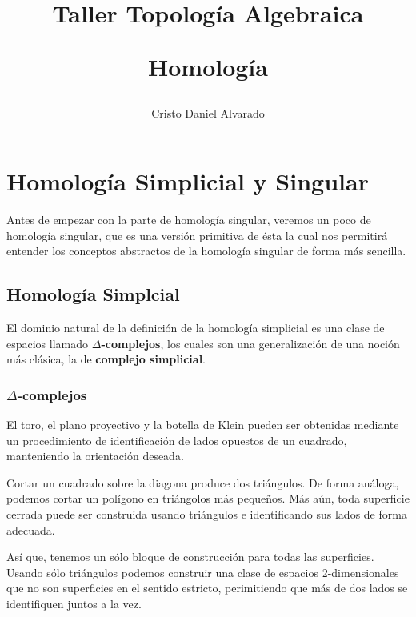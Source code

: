 \documentclass[12pt]{report}
\newcounter{it}
\theoremstyle{largebreak}
\begin{document}
    \setlength{\parskip}{5pt} %
    \setlength{\parindent}{12pt} %
    \title{Taller Topología Algebraica
    
    Homología}
    \author{Cristo Daniel Alvarado}
    \maketitle

    \tableofcontents %

    \setcounter{chapter}{3} %

    \newpage

    \chapter{Homología Simplicial y Singular}

    Antes de empezar con la parte de homología singular, veremos un poco de homología singular, que es una versión primitiva de ésta la cual nos permitirá entender los conceptos abstractos de la homología singular de forma más sencilla.

    \section{Homología Simplcial}

    El dominio natural de la definición de la homología simplicial es una clase de espacios llamado \textbf{$\Delta$-complejos}, los cuales son una generalización de una noción más clásica, la de \textbf{complejo simplicial}.

    \subsection{$\Delta$-complejos}

    El toro, el plano proyectivo y la botella de Klein pueden ser obtenidas mediante un procedimiento de identificación de lados opuestos de un cuadrado, manteniendo la orientación deseada.

    Cortar un cuadrado sobre la diagona produce dos triángulos. De forma análoga, podemos cortar un polígono en triángolos más pequeños. Más aún, toda superficie cerrada puede ser construida usando triángulos e identificando sus lados de forma adecuada.

    Así que, tenemos un sólo bloque de construcción para todas las superficies. Usando sólo triángulos podemos construir una clase de espacios 2-dimensionales que no son superficies en el sentido estricto, perimitiendo que más de dos lados se identifiquen juntos a la vez.
\end{document}
